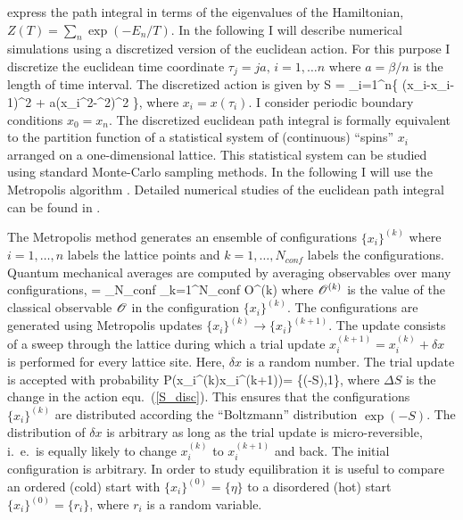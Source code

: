 express the path integral in terms of the eigenvalues of the Hamiltonian, 
$Z(T)=\sum_n\exp(-E_n/T)$. 
In the following I will describe numerical simulations using a discretized 
version of the euclidean action. For this purpose I discretize the euclidean 
time coordinate $\tau_j=ja,\,i=1,\ldots n$ where $a=\beta/n$ is the length 
of time interval. The discretized action is given by
\be
\label{S_disc}
 S = \sum_{i=1}^{n}\left\{  (x_i-x_{i-1})^2
  + a(x_i^2-\eta^2)^2 \right\},
\ee
where $x_i=x(\tau_i)$. I consider periodic boundary conditions $x_0=x_n$. 
The discretized euclidean path integral is formally equivalent to the 
partition function of a statistical system of (continuous) ``spins'' 
$x_i$ arranged on a one-dimensional lattice. This statistical system 
can be studied using standard Monte-Carlo sampling methods. In the following 
I will use the Metropolis algorithm \cite{Metropolis:1953am}. Detailed
numerical studies of the euclidean path integral can be found in 
\cite{Creutz:1980gp,Shuryak:1984xr,Shuryak:1987tr,Schafer:2004xa}.

 The Metropolis method generates an ensemble of configurations
$\{x_i\}^{(k)}$ where $i=1,\ldots, n$ labels the lattice points and $k=
1,\ldots,N_{conf}$ labels the configurations. Quantum mechanical averages 
are computed by averaging observables over many configurations, 
\be 
{} \rangle = \lim_{N_{conf}\to\infty}
 \sum_{k=1}^{N_{conf}}
 {\cal O}^{(k)}
\ee
where ${\cal O}^{(k)}$ is the value of the classical observable
${\cal O}$ in the configuration $\{x_i\}^{(k)}$. The configurations 
are generated using Metropolis updates $\{x_i\}^{(k)}\to \{x_i\}^{(k+1)}$. 
The update consists of a sweep through the lattice during which a trial 
update $x_i^{(k+1)}= x_i^{(k)} +\delta x$ is performed for every lattice 
site. Here, $\delta x$ is a random number. The trial update is accepted 
with probability
\be
 P\left(x_i^{(k)}\to x_i^{(k+1)}\right)=
   \min\left\{\exp(-\Delta S),1\right\},
\ee 
where $\Delta S$ is the change in the action equ.~(\ref{S_disc}). 
This ensures that the configurations $\{x_i\}^{(k)}$ are distributed 
according the ``Boltzmann'' distribution $\exp(-S)$. The distribution 
of $\delta x$ is arbitrary as long as the trial update is micro-reversible, 
i.~e.~is equally likely to change $x_i^{(k)}$ to $x_i^{(k+1)}$ and back. 
The initial configuration is arbitrary. In order to study equilibration 
it is useful to compare an ordered (cold) start with $\{x_i\}^{(0)}=
\{\eta\}$ to a disordered (hot) start $\{x_i\}^{(0)}=\{r_i\}$, where 
$r_i$ is a random variable. 

